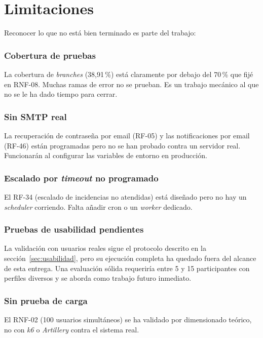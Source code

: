 \section{Limitaciones}
\label{sec:limitaciones}

Reconocer lo que no está bien terminado es parte del trabajo:

\subsubsection*{Cobertura de pruebas}
  La cobertura de \textit{branches} (38{,}91\,\%) está claramente por debajo del 70\,\% que fijé en RNF-08. Muchas ramas de error no se prueban. Es un trabajo mecánico al que no se le ha dado tiempo para cerrar.

\subsubsection*{Sin SMTP real}
  La recuperación de contraseña por email (RF-05) y las notificaciones por email (RF-46) están programadas pero no se han probado contra un servidor real. Funcionarán al configurar las variables de entorno en producción.

\subsubsection*{Escalado por \textit{timeout} no programado}
  El RF-34 (escalado de incidencias no atendidas) está diseñado pero no hay un \textit{scheduler} corriendo. Falta añadir cron o un \textit{worker} dedicado.

\subsubsection*{Pruebas de usabilidad pendientes}
  La validación con usuarios reales sigue el protocolo descrito en la sección~\ref{sec:usabilidad}, pero su ejecución completa ha quedado fuera del alcance de esta entrega. Una evaluación sólida requeriría entre 5 y 15 participantes con perfiles diversos y se aborda como trabajo futuro inmediato.

\subsubsection*{Sin prueba de carga}
  El RNF-02 (100 usuarios simultáneos) se ha validado por dimensionado teórico, no con \textit{k6} o \textit{Artillery} contra el sistema real.

